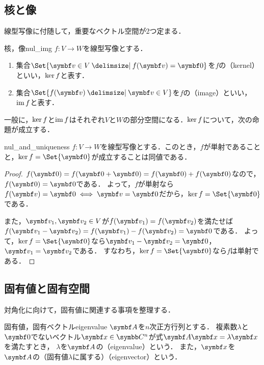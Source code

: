 \documentclass[../../main]{subfiles}
\begin{document}
\subsection{核と像}

線型写像に付随して，重要なベクトル空間が2つ定まる．

\begin{definition}{核，像}{nul_img}
  \(f\colon V\to W\)を線型写像とする．
  \begin{enumerate}
    \item 集合\(\Set{\vect{v}\in V\given f(\vect{v})=\zvec}\)を\(f\)の（kernel）といい，\(\operatorname{ker} f\)と表す．
    \item 集合\(\Set{f(\vect{v})\given\vect{v}\in V}\)を\(f\)の（image）といい，\(\operatorname{im} f\)と表す．
  \end{enumerate}
\end{definition}

一般に，\(\operatorname{ker} f\)と\(\operatorname{im} f\)はそれぞれ\(V\)と\(W\)の部分空間になる．\(\operatorname{ker} f\)について，次の命題が成立する．

\begin{proposition}{}{nul_and_uniqueness}
  \(f\colon V\to W\)を線型写像とする．このとき，\(f\)が単射であることと，\(\nul f=\Set{\zvec}\)が成立することは同値である．
\end{proposition}

\begin{proof}
  \(f(\zvec)=f(\zvec+\zvec)=f(\zvec)+f(\zvec)\)なので，\(f(\zvec)=\zvec\)である．
  よって，\(f\)が単射なら\(f(\vect{v})=\zvec\iff\vect{v}=\zvec\)だから，\(\nul f=\Set{\zvec}\)である．

  また，\(\vect{v}_1,\vect{v}_2\in V\)が\(f(\vect{v}_1)=f(\vect{v}_2)\)を満たせば\(f(\vect{v}_1-\vect{v}_2)=f(\vect{v}_1)-f(\vect{v}_2)=\zvec\)である．
  よって，\(\nul f=\Set{\zvec}\)なら\(\vect{v}_1-\vect{v}_2=\zvec\)，\(\vect{v}_1=\vect{v}_2\)である．
すなわち，\(\nul f=\Set{\zvec}\)なら\(f\)は単射である．
\end{proof}

\subsection{固有値と固有空間}

対角化に向けて，固有値に関連する事項を整理する．

\begin{definition}{固有値，固有ベクトル}{eigenvalue}
  \(\mat{A}\)を\(n\)次正方行列とする．
  複素数\(\lambda\)と\(\zvec\)でないベクトル\(\vect{x}\in\numset{C}^n\)が式\(\mat{A}\vect{x}=\lambda\vect{x}\)を満たすとき，
  \(\lambda\)を\(\mat{A}\)の（eigenvalue）という．
  また，\(\vect{x}\)を\(\mat{A}\)の（固有値\(\lambda\)に属する）（eigenvector）という．
\end{definition}
\end{document}
